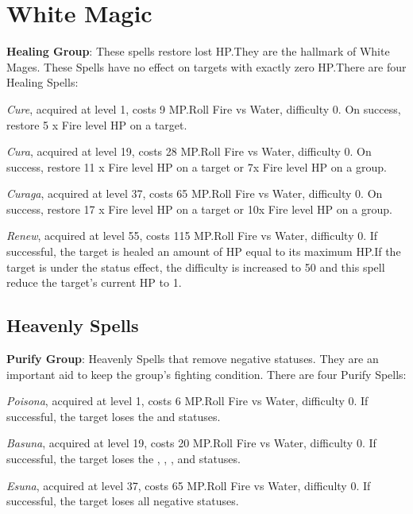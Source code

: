 \section{White Magic}\label{sec:magic-white}

\begin{multicols}{2}
	
    \textbf{Healing Group}: These spells restore lost HP.\@{}They are the hallmark of White Mages. These Spells have no effect on targets with exactly zero HP.\@{}There are four Healing Spells:

    \textit{Cure}, acquired at level 1, costs 9 MP.\@{}Roll Fire vs Water, difficulty 0. On success, restore 5 x Fire level HP on a target.

    \textit{Cura}, acquired at level 19, costs 28 MP.\@{}Roll Fire vs Water, difficulty 0. On success, restore 11 x Fire level HP on a target or 7x Fire level HP on a group.

    \textit{Curaga}, acquired at level 37, costs 65 MP.\@{}Roll Fire vs Water, difficulty 0. On success, restore 17 x Fire level HP on a target or 10x Fire level HP on a group.

    \textit{Renew}, acquired at level 55, costs 115 MP.\@{}Roll Fire vs Water, difficulty 0. If successful, the target is healed an amount of HP equal to its maximum HP.\@{}If the target is under the  status effect, the difficulty is increased to 50 and this spell reduce the target’s current HP to 1.

    \subsection{Heavenly Spells}\label{subsec:white-heavenly}

    \textbf{Purify Group}: Heavenly Spells that remove negative statuses. They are an important aid to keep the group’s fighting condition. There are four Purify Spells:

    \textit{Poisona}, acquired at level 1, costs 6 MP.\@{}Roll Fire vs Water, difficulty 0. If successful, the target loses the  and  statuses.

    \textit{Basuna}, acquired at level 19, costs 20 MP.\@{}Roll Fire vs Water, difficulty 0. If successful, the target loses the , , ,  and  statuses.

    \textit{Esuna}, acquired at level 37, costs 65 MP.\@{}Roll Fire vs Water, difficulty 0. If successful, the target loses all negative statuses.


\end{multicols}

